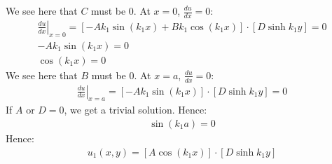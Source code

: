 \documentclass[11pt]{article}
\numberwithin{equation}{section}
\begin{document}
We see here that $C$ must be 0. At $x = 0$, $\frac{du}{dx} = 0$:
\begin{gather}
  \left. \frac{du}{dx} \right|_{x = 0} = \left[ -Ak_1 \sin{\left(k_1 x\right)} + B k_1 \cos{\left(k_1 x\right)} \right] \cdot \left[ D \sinh{k_1 y} \right] = 0\\
  -Ak_1 \sin{\left(k_1 x\right)} = 0\\
  \cos{\left(k_1 x\right)} = 0
\end{gather}
We see here that $B$ must be 0. At $x = a$, $\frac{du}{dx} = 0$:
\begin{gather}
  \left. \frac{du}{dx} \right|_{x = a} = \left[ -Ak_1 \sin{\left(k_1 x\right)} \right] \cdot \left[ D \sinh{k_1 y} \right] = 0
\end{gather}
If $A$ or $D = 0$, we get a trivial solution. Hence:
\begin{gather}
  \sin{\left(k_1 a\right)} = 0
\end{gather}
Hence:
\begin{gather}
  u_1(x,y) = \left[ A\cos{\left(k_1 x \right)}\right]\cdot \left[ D\sinh{k_1 y} \right]
\end{gather}
\end{document}

